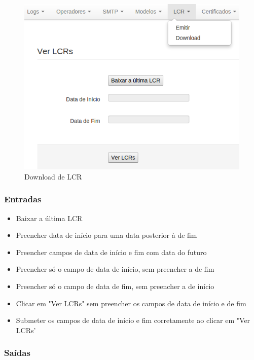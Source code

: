 \begin{figure}[ht]
     \centering
     \includegraphics[scale=0.6]{images/lcr.png}
     \caption{Download de LCR}
     \label{fig:lcr}
\end{figure}

\subsubsection{Entradas}
\begin{itemize}

	\item Baixar a última LCR
	\item Preencher data de início para uma data posterior à de fim
	\item Preencher campos de data de início e fim com data do futuro
	\item Preencher só o campo de data de início, sem preencher a de fim
	\item Preencher só o campo de data de fim, sem preencher a de início
	\item Clicar em "Ver LCRs" sem preencher os campos de data de início e de fim
	\item Submeter os campos de data de início e fim corretamente ao clicar em "Ver LCRs'
	
\end{itemize}

\subsubsection{Saídas}

